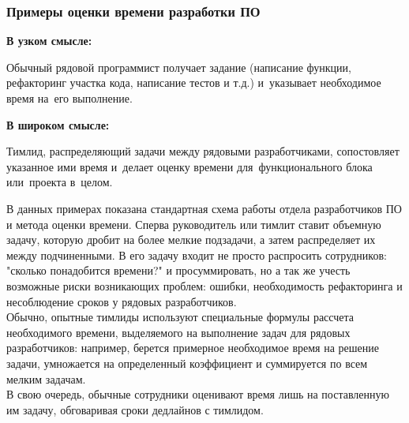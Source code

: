 \documentclass{../industrial-development}
\begin{document}
\begin{frame} \frametitle{Примеры оценки времени разработки ПО}
	\begin{minipage}{0.47\textwidth}
		\textbf{В узком смысле:}
		
		Обычный рядовой программист получает задание (написание функции, рефакторинг участка кода, написание тестов и т.д.) и~указывает необходимое время на~его выполнение.
	\end{minipage}
	\hfill
	\begin{minipage}{0.5\textwidth}
		\textbf{В широком смысле:}
		
		Тимлид, распределяющий задачи между рядовыми разработчиками, сопостовляет указанное ими время и~делает оценку времени для~функционального блока или~проекта в~целом.
	\end{minipage}
\end{frame}
\lecturenotes
В данных примерах показана стандартная схема работы отдела разработчиков ПО и метода оценки времени. Сперва руководитель или тимлит ставит объемную задачу, которую дробит на более мелкие подзадачи, а затем распределяет их между подчиненными. В его задачу входит не просто распросить сотрудников: "сколько понадобится времени?" и просуммировать, но а так же учесть возможные риски возникающих проблем: ошибки, необходимость рефакторинга и несоблюдение сроков у рядовых разработчиков.\\
Обычно, опытные тимлиды используют специальные формулы рассчета необходимого времени, выделяемого на выполнение задач для рядовых разработчиков: например, берется примерное необходимое время на решение задачи, умножается на определенный коэффициент и суммируется по всем мелким задачам.\\
В свою очередь, обычные сотрудники оценивают время лишь на поставленную им задачу, обговаривая сроки дедлайнов с тимлидом.
\end{document}
